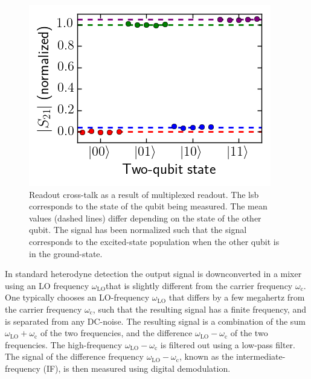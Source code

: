           \begin{figure}
            \begin{center}
            \vspace{-30pt}
              \includegraphics[width=\textwidth]{../Figures/Calibration routines/crosstalk.png}
            \end{center}
            \vspace{-20 pt}
            \caption{Readout cross-talk as a result of multiplexed readout. The lsb corresponds to the state of the qubit being measured. The mean values (dashed lines) differ depending on the state of the other qubit. The signal has been normalized such that the signal corresponds to the excited-state population when the other qubit is in the ground-state.}
            \label{fig:crosstalk}
          \end{figure}
          In standard heterodyne detection the output signal is downconverted in a mixer using an LO frequency $\omega_\text{LO}$that is slightly different from the carrier frequency $\omega_\text{c}$. One typically chooses an LO-frequency $\omega_\text{LO}$ that differs by a few megahertz from the carrier frequency $\omega_\text{c}$, such that the resulting signal has a finite frequency, and is separated from any DC-noise. The resulting signal is a combination of the sum $\omega_\text{LO} + \omega_\text{c}$ of the two frequencies, and the difference $\omega_\text{LO} - \omega_\text{c}$ of the two frequencies. The high-frequency $\omega_\text{LO} - \omega_\text{c}$ is filtered out using a low-pass filter. The signal of the difference frequency $\omega_\text{LO} - \omega_\text{c}$, known as the intermediate-frequency (IF), is then measured using digital demodulation.

